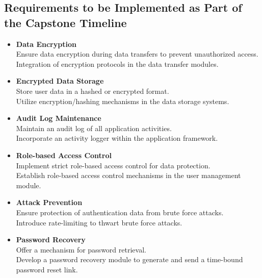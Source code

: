 \documentclass{article}
\newcounter{srrnum} %
\newcommand{\rthesrrnum}{SR\refstepcounter{srrnum}\thesrrnum:}
\begin{document}
\subsection{Requirements to be Implemented as Part of the Capstone Timeline}
\begin{itemize}[leftmargin=16.5mm,labelsep=4mm,label=\rthesrrnum]
    \item \textbf{Data Encryption} \\
    Ensure data encryption during data transfers to prevent unauthorized access. \\
    Integration of encryption protocols in the data transfer modules. \\
    
    \item \textbf{Encrypted Data Storage} \\
    Store user data in a hashed or encrypted format. \\
    Utilize encryption/hashing mechanisms in the data storage systems. \\
    
    \item \textbf{Audit Log Maintenance} \\
    Maintain an audit log of all application activities. \\
    Incorporate an activity logger within the application framework. \\
    
    \item \textbf{Role-based Access Control} \\
    Implement strict role-based access control for data protection. \\
    Establish role-based access control mechanisms in the user management module. \\
    
    \item \textbf{Attack Prevention} \\
    Ensure protection of authentication data from brute force attacks. \\
    Introduce rate-limiting to thwart brute force attacks. \\
    
    \item \textbf{Password Recovery} \\
    Offer a mechanism for password retrieval. \\
    Develop a password recovery module to generate and send a time-bound password reset link. \\
\end{itemize}
\end{document}
